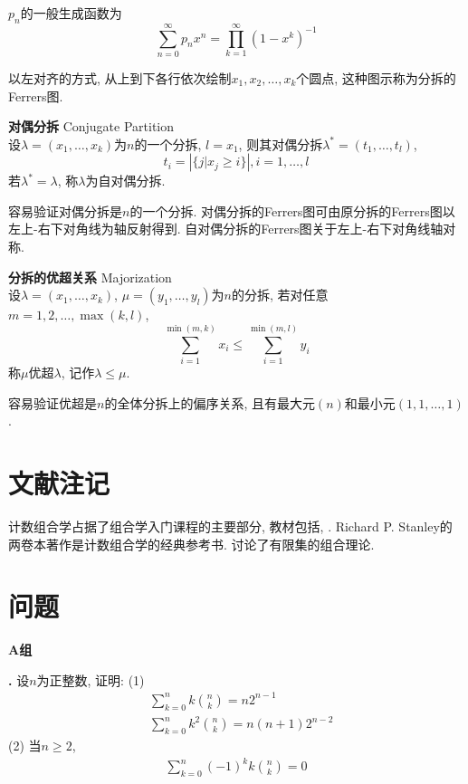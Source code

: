$p_n$的一般生成函数为
\begin{equation*}
    \sum_{n=0}^\infty p_nx^n = \prod_{k=1}^\infty (1-x^k)^{-1}
\end{equation*}

\par 以左对齐的方式, 从上到下各行依次绘制$x_1,x_2,\dots,x_k$个圆点, 这种图示称为分拆的Ferrers图. 

\begin{dfn} \textbf{对偶分拆} Conjugate Partition\\
设$\lambda=(x_1,\dots,x_k)$为$n$的一个分拆, $l=x_1$, 则其对偶分拆$\lambda^*=(t_1,\dots,t_l)$, 
\begin{equation}
    t_i = |\{j\vert x_j\ge i\}|, i=1,\dots,l
\end{equation}
若$\lambda^*=\lambda$, 称$\lambda$为自对偶分拆. 
\end{dfn}
容易验证对偶分拆是$n$的一个分拆. 对偶分拆的Ferrers图可由原分拆的Ferrers图以左上-右下对角线为轴反射得到. 自对偶分拆的Ferrers图关于左上-右下对角线轴对称. 

\begin{dfn} \textbf{分拆的优超关系} Majorization\\
设$\lambda=(x_1,\dots,x_k)$, $\mu=(y_1,\dots,y_l)$为$n$的分拆, 若对任意$m=1,2,\dots, \max(k,l)$, 
\begin{equation}
    \sum_{i=1}^{\min(m,k)} x_i \le \sum_{i=1}^{\min(m,l)} y_i
\end{equation}
称$\mu$优超$\lambda$, 记作$\lambda \le \mu$. 
\end{dfn}
容易验证优超是$n$的全体分拆上的偏序关系, 且有最大元$(n)$和最小元$(1,1,\dots,1)$. 

\section*{文献注记}
计数组合学占据了组合学入门课程的主要部分, 教材包括\cite{IC}, \cite{CGT}. Richard P. Stanley的两卷本著作\cite{EC1}是计数组合学的经典参考书. \cite{CFS}讨论了有限集的组合理论. 


\section*{问题}

\par \textbf{A组}
\par \textbf{\theprobenum .} 设$n$为正整数, 证明: (1)
\begin{align}
    &\sum_{k=0}^n k\binom{n}{k}=n2^{n-1}\\
    &\sum_{k=0}^n k^2 \binom{n}{k}=n(n+1)2^{n-2}
\end{align}
(2)\cite{IC} 当$n\ge 2$, 
\begin{align}
    \sum_{k=0}^n (-1)^k k\binom{n}{k}=0
\end{align}

